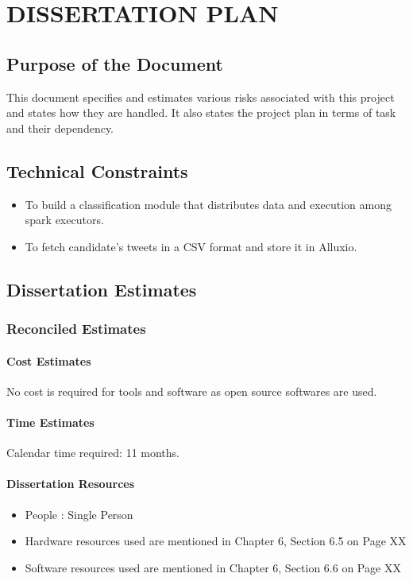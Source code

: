 \documentclass[oneside,a4paper,12pt]{pictreport}
\begin{document}
\chapter{DISSERTATION PLAN}

\section{Purpose of the Document}
This document specifies and estimates various risks associated with this project and states how they are handled. It also states the project plan in terms of task and their dependency.

\section{Technical Constraints}
\begin{itemize}
\item To build a classification module that distributes data and execution among spark executors.
\item To fetch candidate's tweets in a CSV format and store it in Alluxio.
\end{itemize}

\section{Dissertation Estimates}
\subsection{Reconciled Estimates}
\subsubsection{Cost Estimates}
No cost is required for tools and software as open source softwares are used.
\subsubsection{Time Estimates}
Calendar time required: 11 months.
\subsubsection{Dissertation Resources}
\begin{itemize}
\item People : Single Person
\item Hardware resources used are mentioned in Chapter 6, Section 6.5 on Page XX
\item Software resources used are mentioned in Chapter 6, Section 6.6 on Page XX
\end{itemize}
\end{document}

